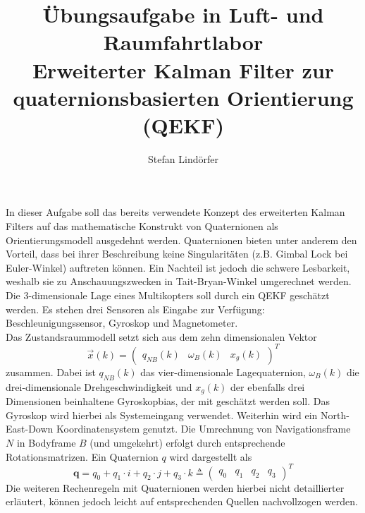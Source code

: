 \documentclass[12pt,a4paper]{article}
\begin{document}
	\title{Übungsaufgabe in Luft- und Raumfahrtlabor\\Erweiterter Kalman Filter zur quaternionsbasierten Orientierung (QEKF)}
	\author{Stefan Lindörfer}
	\maketitle{}
	
	In dieser Aufgabe soll das bereits verwendete Konzept des erweiterten Kalman Filters auf das mathematische Konstrukt von Quaternionen als Orientierungsmodell ausgedehnt werden. Quaternionen bieten unter anderem den Vorteil, dass bei ihrer Beschreibung keine Singularitäten (z.B. Gimbal Lock bei Euler-Winkel) auftreten können. Ein Nachteil ist jedoch die schwere Lesbarkeit, weshalb sie zu Anschauungszwecken in Tait-Bryan-Winkel umgerechnet werden.\\
	
	Die 3-dimensionale Lage eines Multikopters soll durch ein QEKF geschätzt werden. Es stehen drei Sensoren als Eingabe zur Verfügung: Beschleunigungssensor, Gyroskop und Magnetometer.\\
	
	Das Zustandsraummodell setzt sich aus dem zehn dimensionalen Vektor
	\begin{equation}\label{eq:Zustandsraummodell}
		\vec{x}(k)= \begin{pmatrix}
		q_{NB}(k) & \omega_{B}(k) & x_{g}(k)
		\end{pmatrix}^{T}
	\end{equation}
	zusammen. Dabei ist $q_{NB}(k)$ das vier-dimensionale Lagequaternion, $\omega_{B}(k)$ die drei-dimensionale Drehgeschwindigkeit und $x_{g}(k)$ der ebenfalls drei Dimensionen beinhaltene Gyroskopbias, der mit geschätzt werden soll. Das Gyroskop wird hierbei als Systemeingang verwendet. Weiterhin wird ein North-East-Down Koordinatensystem genutzt. Die Umrechnung von Navigationsframe $N$ in Bodyframe $B$ (und umgekehrt) erfolgt durch entsprechende Rotationsmatrizen. Ein Quaternion $q$ wird dargestellt als
	\begin{equation}\label{eq:QuaternionDarstellung}
		\textbf{q}=q_{0}+q_{1}\cdot i+q_{2}\cdot j+q_{3}\cdot k\triangleq \begin{pmatrix}
		q_{0} & q_{1} & q_{2} & q_{3}
		\end{pmatrix}^{T}		
	\end{equation}
	Die weiteren Rechenregeln mit Quaternionen werden hierbei nicht detaillierter erläutert, können jedoch leicht auf entsprechenden Quellen nachvollzogen werden.
\end{document}

